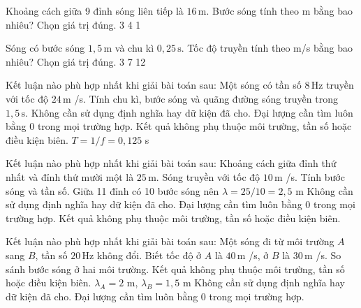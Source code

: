 \begin{ex}
Khoảng cách giữa 9 đỉnh sóng liên tiếp là $16\,\text{m}$. Bước sóng tính theo m bằng bao nhiêu? Chọn giá trị đúng.
\choice
{3}
{}
{4}
{1}
\end{ex}

\begin{ex}
Sóng có bước sóng $1,5\,\text{m}$ và chu kì $0,25\,\text{s}$. Tốc độ truyền tính theo m/s bằng bao nhiêu? Chọn giá trị đúng.
\choice
{3}
{7}
{}
{12}
\end{ex}

\begin{ex}
Kết luận nào phù hợp nhất khi giải bài toán sau: Một sóng có tần số $8\,\text{Hz}$ truyền với tốc độ $24\,\text{m}$ /s. Tính chu kì, bước sóng và quãng đường sóng truyền trong $1,5\,\text{s}$.
\choice
{Không cần sử dụng định nghĩa hay dữ kiện đã cho.}
{Đại lượng cần tìm luôn bằng 0 trong mọi trường hợp.}
{Kết quả không phụ thuộc môi trường, tần số hoặc điều kiện biên.}
{\True $T=1/f=0,125$ s}
\end{ex}

\begin{ex}
Kết luận nào phù hợp nhất khi giải bài toán sau: Khoảng cách giữa đỉnh thứ nhất và đỉnh thứ mười một là $25\,\text{m}$. Sóng truyền với tốc độ $10\,\text{m}$ /s. Tính bước sóng và tần số.
\choice
{\True Giữa 11 đỉnh có 10 bước sóng nên $\lambda=25/10=2,5$ m}
{Không cần sử dụng định nghĩa hay dữ kiện đã cho.}
{Đại lượng cần tìm luôn bằng 0 trong mọi trường hợp.}
{Kết quả không phụ thuộc môi trường, tần số hoặc điều kiện biên.}
\end{ex}

\begin{ex}
Kết luận nào phù hợp nhất khi giải bài toán sau: Một sóng đi từ môi trường $A$ sang $B$, tần số $20\,\text{Hz}$ không đổi. Biết tốc độ ở $A$ là $40\,\text{m}$ /s, ở $B$ là $30\,\text{m}$ /s. So sánh bước sóng ở hai môi trường.
\choice
{Kết quả không phụ thuộc môi trường, tần số hoặc điều kiện biên.}
{\True $\lambda_A=2$ m, $\lambda_B=1,5$ m}
{Không cần sử dụng định nghĩa hay dữ kiện đã cho.}
{Đại lượng cần tìm luôn bằng 0 trong mọi trường hợp.}
\end{ex}

